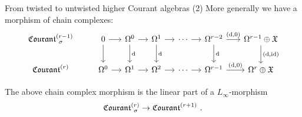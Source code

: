 \documentclass[beamer,10pt]{standalone}
\begin{document}
\begin{frame}{From twisted to untwisted higher Courant algebras (2)}
	More generally we have a morphism of chain complexes:
	\begin{displaymath}
		\begin{tikzcd}[ampersand replacement=\&,column sep = small]
			\Courant[\sigma]{r-1} %
			\&[1em]
			0 \ar[r] \ar[d]
			\& \Omega^0 \ar[d,"\d"] \ar[r]
			\& \Omega^1 \ar[d,"\d"] \ar[r]
			\& \cdots \ar[r]
			\& \Omega^{r-2} \ar[d,"\d"] \ar[r,"{(\d,0)}"]
			\&[.5em]  \Omega^{r-1} \oplus \X \ar[d,"{(\d,\id)}"]
			\\
			\Courant{r} %
			\& \Omega^0 \ar[r]
			\& \Omega^1 \ar[r]
			\& \Omega^2 \ar[r]
			\& \cdots \ar[r]
			\& \Omega^{r-1} \ar[r,"{(\d,0)}"]
			\&\Omega^{r} \oplus \X
		\end{tikzcd}
	\end{displaymath}

	\vfill\pause

	\begin{thmblock}[{[Fiorenza-M. 2025]}]
		The above chain complex morphism is the linear part of a $L_\infty$-morphism $$\Courant[\sigma]{r} \to \Courant{r+1}~.$$
	\end{thmblock}

	\vfill
\end{frame}
\end{document}

